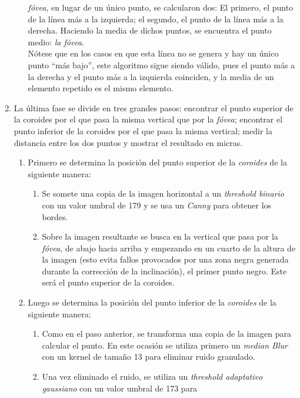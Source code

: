 \begin{enumerate}
\begin{enumerate}[label*=\arabic*.]
    \emph{fóvea}, en lugar de un único punto, se calcularon dos: El
    primero, el punto de la línea más a la izquierda; el segundo, el
    punto de la línea más a la derecha. Haciendo la media de dichos
    puntos, se encuentra el
    punto medio: \emph{la fóvea}. \\
    Nótese que en los casos en que esta línea no se genera y hay un
    único punto ``más bajo'', este algoritmo sigue siendo válido, pues
    el punto más a la derecha y el punto más a la izquierda coinciden,
    y la media de un elemento repetido es el mismo elemento.
  \end{enumerate}
\item La última fase se divide en tres grandes pasos: encontrar el
  punto superior de la coroides por el que pasa la misma vertical que
  por la \emph{fóvea}; encontrar el punto inferior de la coroides por
  el que pasa la misma vertical; medir la distancia entre los dos
  puntos y mostrar el resultado en micras.
  \begin{enumerate}[label*=\arabic*.]
  \item Primero se determina la posición del punto superior de la
    \emph{coroides} de la siguiente manera:
    \begin{enumerate}[label*=\arabic*.]
    \item Se somete una copia de la imagen horizontal a un
      \emph{threshold binario} con un valor umbral de 179 y se usa un
      \emph{Canny} para obtener los bordes.
    \item Sobre la imagen resultante se busca en la vertical que pasa
      por la \emph{fóvea}, de abajo hacia arriba y empezando en un
      cuarto de la altura de la imagen (esto evita fallos provocados
      por una zona negra generada durante la corrección de la
      inclinación), el primer punto negro. Este será el punto superior
      de la coroides.
    \end{enumerate}
  \item Luego se determina la posición del punto inferior de la
    \emph{coroides} de la siguiente manera:
    \begin{enumerate}[label*=\arabic*.]
    \item Como en el paso anterior, se transforma una copia de la
      imagen para calcular el punto. En este ocasión se utiliza
      primero un \emph{median Blur} con un kernel de tamaño 13 para
      eliminar ruido granulado.
    \item Una vez eliminado el ruido, se utiliza un \emph{threshold
        adaptativo gaussiano} con un valor umbral de 173 para

\end{enumerate}
\end{enumerate}
\end{enumerate}
